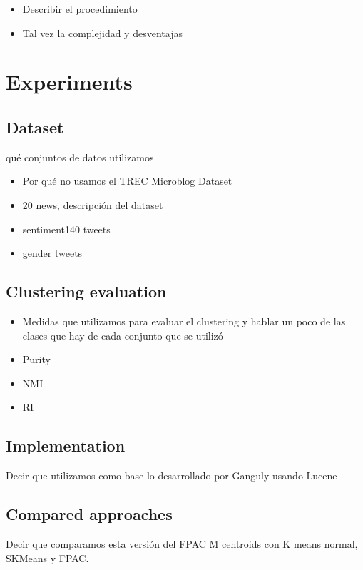 \documentclass[runningheads]{llncs}
\begin{document}
\begin{itemize}
\item Describir el procedimiento
\item Tal vez la complejidad y desventajas
\end{itemize}

\section{Experiments}

\subsection{Dataset}

qué conjuntos de datos utilizamos

\begin{itemize}
\item Por qué no usamos el TREC Microblog Dataset
\item 20 news, descripción del dataset 
\item sentiment140 tweets
\item gender tweets
\end{itemize}

\subsection{Clustering evaluation}
\begin{itemize}
\item Medidas que utilizamos para evaluar el clustering y hablar un poco de las clases
que hay de cada conjunto que se utilizó
\item Purity
\item NMI
\item RI

\end{itemize}

\subsection{Implementation}

Decir que utilizamos como base lo desarrollado por Ganguly usando Lucene
\subsection{Compared approaches}

Decir que comparamos esta versión del FPAC M centroids con K means normal, SKMeans y FPAC.
\end{document}
